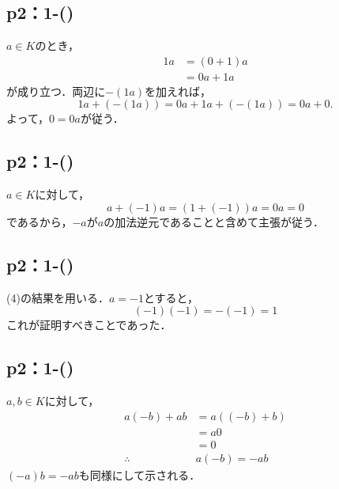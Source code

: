 \subsection*{p2：1-()}
\begin{tproof}
    $a \in K$のとき，
    \begin{align*}
        1a & = (0 + 1)a \\
           & = 0a + 1a
    \end{align*}
    が成り立つ．両辺に$-(1a)$を加えれば，
    \[
        1a + (-(1a)) = 0a + 1a + (-(1a)) = 0a + 0.
    \]
    よって，$0 = 0a$が従う．
\end{tproof}

\subsection*{p2：1-()}
\begin{tproof}
    $a \in K$に対して，
    \[
        a+(-1)a=(1+(-1))a =0a =0
    \]
    であるから，$-a$が$a$の加法逆元であることと含めて主張が従う．
\end{tproof}

\newpage

\subsection*{p2：1-()}
\begin{tproof}
    (4)の結果を用いる．$a=-1$とすると，
    \[
        (-1)(-1)=-(-1)=1
    \]
    これが証明すべきことであった．
\end{tproof}
\subsection*{p2：1-()}
\begin{tproof}
    $a,b \in K$に対して，
    \begin{align*}
        a(-b)+ab         & = a((-b)+b) \\
                         & = a0        \\
                         & =0          \\
        \therefore \quad & a(-b)=-ab
    \end{align*}
    $(-a)b = -ab$も同様にして示される．
\end{tproof}

